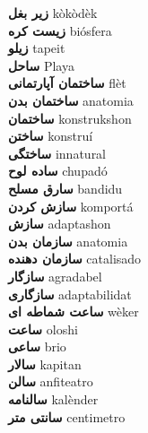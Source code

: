 \textbf{ زیر بغل  } kòkòdèk \\
\textbf{ زیست کره  } biósfera \\
\textbf{ زیلو  } tapeit \\
\textbf{ ساحل  } Playa \\
\textbf{ ساختمان آپارتمانی  } flèt \\
\textbf{ ساختمان بدن  } anatomia \\
\textbf{ ساختمان  } konstrukshon \\
\textbf{ ساختن  } konstruí \\
\textbf{ ساختگی  } innatural \\
\textbf{ ساده لوح  } chupadó \\
\textbf{ سارق مسلح  } bandidu \\
\textbf{ سازش کردن  } komportá \\
\textbf{ سازش  } adaptashon \\
\textbf{ سازمان بدن  } anatomia \\
\textbf{ سازمان دهنده  } catalisado \\
\textbf{ سازگار  } agradabel \\
\textbf{ سازگاری  } adaptabilidat \\
\textbf{ ساعت شماطه ای  } wèker \\
\textbf{ ساعت  } oloshi \\
\textbf{ ساعی  } brio \\
\textbf{ سالار  } kapitan \\
\textbf{ سالن  } anfiteatro \\
\textbf{ سالنامه  } kalènder \\
\textbf{ سانتی متر  } centimetro \\
